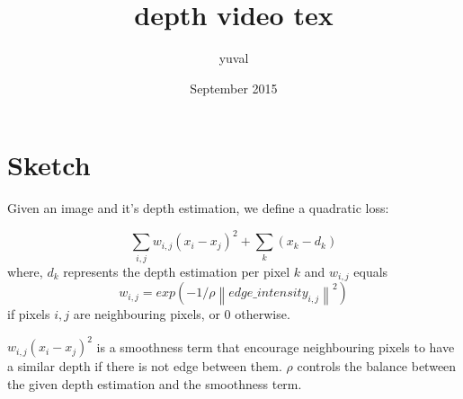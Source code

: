 \documentclass{article}
\title{depth video tex}
\author{yuval }
\date{September 2015}
\newcommand{\norm}[1]{\left\lVert #1 \right\rVert}
\begin{document}
\maketitle

\section{Sketch}

Given an image and it's depth estimation, we define a quadratic loss:

\begin{equation}
\sum_{i,j}{w_{i,j} (x_i  - x_j)^2} + \sum_{k}{(x_k - d_k)}
\end{equation}
where, $d_k$ represents the depth estimation per pixel $k$ and $w_{i,j}$ equals
\begin{equation}
w_{i,j} = exp(-1/\rho \norm{edge\_intensity_{i,j}}^2)
\end{equation}
if pixels $i,j$ are neighbouring pixels, or $0$ otherwise. 

${w_{i,j} (x_i  - x_j)^2}$ is a smoothness term that encourage neighbouring pixels to have a similar depth if there is not edge between them.
$\rho$ controls the balance between the given depth estimation and the smoothness term.
\end{document}
